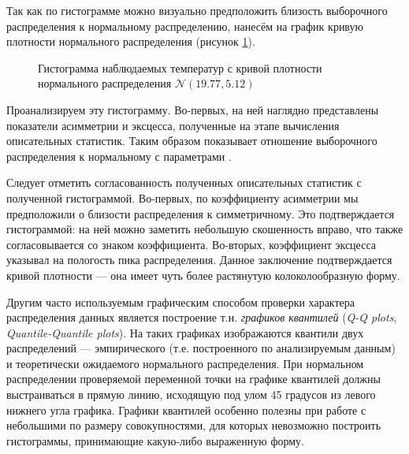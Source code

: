 Так как по гистограмме можно визуально предположить близость выборочного распределения к нормальному распределению, нанесём на график кривую плотности нормального распределения (рисунок \ref{img:histogram_fitted}).
\begin{figure}[ht]
\caption{Гистограмма наблюдаемых температур с кривой плотности нормального распределения $\mathcal{N}(19.77, 5.12)$}
\label{img:histogram_fitted}
\end{figure}
Проанализируем эту гистограмму. Во-первых, на ней наглядно представлены показатели асимметрии и эксцесса, полученные на этапе вычисления описательных статистик. Таким образом показывает отношение выборочного распределения к нормальному с параметрами \normaldistr.

Следует отметить согласованность полученных описательных статистик с полученной гистограммой. Во-первых, по коэффициенту асимметрии мы предположили о близости распределения к симметричному. Это подтверждается гистограммой: на ней можно заметить небольшую скошенность вправо, что также согласовывается со знаком коэффициента. Во-вторых, коэффициент эксцесса указывал на пологость пика распределения. Данное заключение подтверждается кривой плотности --- она имеет чуть более растянутую колоколообразную форму.

Другим часто используемым графическим способом проверки характера распределения данных является построение т.н. \textit{графиков квантилей} (\textit{Q-Q plots}, \textit{Quantile-Quantile plots}). На таких графиках изображаются квантили двух распределений --- эмпирического (т.е. построенного по анализируемым данным) и теоретически ожидаемого нормального распределения. При нормальном распределении проверяемой переменной точки на графике квантилей должны выстраиваться в прямую линию, исходящую под улом 45 градусов из левого нижнего угла графика. Графики квантилей особенно полезны при работе с небольшими по размеру совокупностями, для которых невозможно построить гистограммы, принимающие какую-либо выраженную форму.

